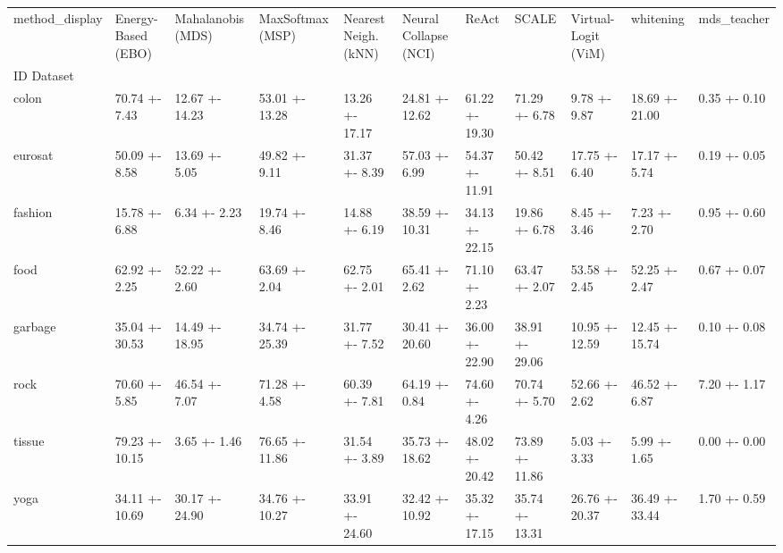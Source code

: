 \begin{tabular}{lllllllllll}
\toprule
method_display & Energy-Based (EBO) & Mahalanobis (MDS) & MaxSoftmax (MSP) & Nearest Neigh. (kNN) & Neural Collapse (NCI) & ReAct & SCALE & Virtual-Logit (ViM) & whitening & mds_teacher \\
ID Dataset &  &  &  &  &  &  &  &  &  &  \\
\midrule
colon & 70.74 +- 7.43 & 12.67 +- 14.23 & 53.01 +- 13.28 & 13.26 +- 17.17 & 24.81 +- 12.62 & 61.22 +- 19.30 & 71.29 +- 6.78 & 9.78 +- 9.87 & 18.69 +- 21.00 & 0.35 +- 0.10 \\
eurosat & 50.09 +- 8.58 & 13.69 +- 5.05 & 49.82 +- 9.11 & 31.37 +- 8.39 & 57.03 +- 6.99 & 54.37 +- 11.91 & 50.42 +- 8.51 & 17.75 +- 6.40 & 17.17 +- 5.74 & 0.19 +- 0.05 \\
fashion & 15.78 +- 6.88 & 6.34 +- 2.23 & 19.74 +- 8.46 & 14.88 +- 6.19 & 38.59 +- 10.31 & 34.13 +- 22.15 & 19.86 +- 6.78 & 8.45 +- 3.46 & 7.23 +- 2.70 & 0.95 +- 0.60 \\
food & 62.92 +- 2.25 & 52.22 +- 2.60 & 63.69 +- 2.04 & 62.75 +- 2.01 & 65.41 +- 2.62 & 71.10 +- 2.23 & 63.47 +- 2.07 & 53.58 +- 2.45 & 52.25 +- 2.47 & 0.67 +- 0.07 \\
garbage & 35.04 +- 30.53 & 14.49 +- 18.95 & 34.74 +- 25.39 & 31.77 +- 7.52 & 30.41 +- 20.60 & 36.00 +- 22.90 & 38.91 +- 29.06 & 10.95 +- 12.59 & 12.45 +- 15.74 & 0.10 +- 0.08 \\
rock & 70.60 +- 5.85 & 46.54 +- 7.07 & 71.28 +- 4.58 & 60.39 +- 7.81 & 64.19 +- 0.84 & 74.60 +- 4.26 & 70.74 +- 5.70 & 52.66 +- 2.62 & 46.52 +- 6.87 & 7.20 +- 1.17 \\
tissue & 79.23 +- 10.15 & 3.65 +- 1.46 & 76.65 +- 11.86 & 31.54 +- 3.89 & 35.73 +- 18.62 & 48.02 +- 20.42 & 73.89 +- 11.86 & 5.03 +- 3.33 & 5.99 +- 1.65 & 0.00 +- 0.00 \\
yoga & 34.11 +- 10.69 & 30.17 +- 24.90 & 34.76 +- 10.27 & 33.91 +- 24.60 & 32.42 +- 10.92 & 35.32 +- 17.15 & 35.74 +- 13.31 & 26.76 +- 20.37 & 36.49 +- 33.44 & 1.70 +- 0.59 \\
\bottomrule
\end{tabular}
